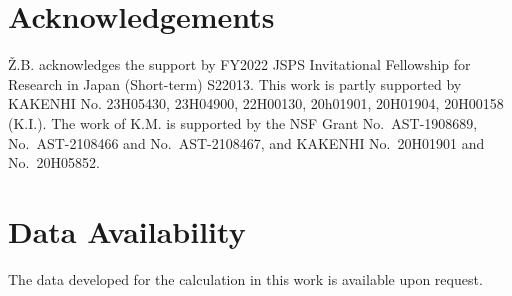 \documentclass[fleqn,usenatbib]{mnras}
\begin{document}
\section*{Acknowledgements}
\v Z.B. acknowledges the support by FY2022 JSPS Invitational Fellowship for Research in Japan (Short-term) S22013. This work is partly supported by KAKENHI No. 23H05430, 23H04900, 22H00130, 20h01901, 20H01904, 20H00158 (K.I.).
The work of K.M. is supported by the NSF Grant No.~AST-1908689, No.~AST-2108466 and No.~AST-2108467, and KAKENHI No.~20H01901 and No.~20H05852.

\section*{Data Availability}
The data developed for the calculation in this work is available upon request.











\appendix



\bsp	%
\label{lastpage}
\end{document}

